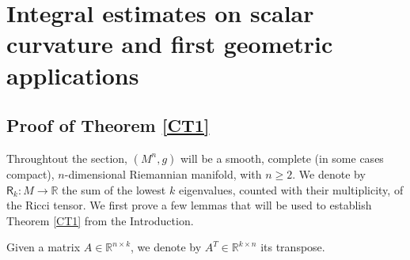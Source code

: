 \documentclass[10pt]{article}
\theoremstyle{definition}
\newcommand{\bb}[1]{\mathbb{#1}}
\newcommand{\R}{\mathsf{R}}
\begin{document}
\section{Integral estimates on scalar curvature and first geometric applications} \label{S3}

\subsection{Proof of Theorem \ref{CT1}} \label{S:proofMain}

Throughtout the section,  $(M^n,g)$ will be a smooth, complete (in some cases compact), $n$-dimensional Riemannian manifold, with $n\geq 2$. We denote by $\R_k:M \to \bb{R}$ the sum of the lowest $k$ eigenvalues, counted with their multiplicity, of the Ricci tensor. We first prove a few lemmas that will be used  to establish Theorem \ref{CT1} from the Introduction.

Given a matrix $A \in \bb{R}^{n \times k}$, we denote by $A^T \in \bb{R}^{k \times n}$ its transpose.
\end{document}

